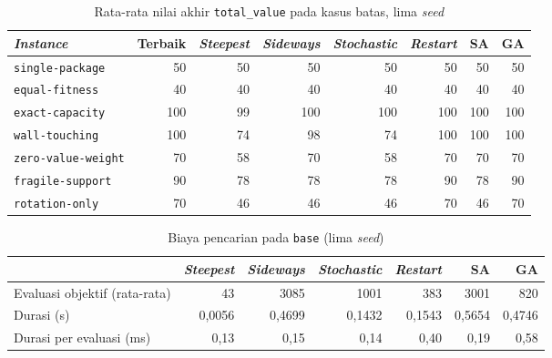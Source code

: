 \begin{table}[H]
    \centering
    \small
    \begin{tabular}{@{}lrrrrrrr@{}}
        \toprule
        \textit{Instance}          & Terbaik & \textit{Steepest} & \textit{Sideways} & \textit{Stochastic} & \textit{Restart} & SA  & GA  \\
        \midrule
        \texttt{single-package}    & 50      & 50                & 50                & 50                  & 50               & 50  & 50  \\
        \texttt{equal-fitness}     & 40      & 40                & 40                & 40                  & 40               & 40  & 40  \\
        \texttt{exact-capacity}    & 100     & 99                & 100               & 100                 & 100              & 100 & 100 \\
        \texttt{wall-touching}     & 100     & 74                & 98                & 74                  & 100              & 100 & 100 \\
        \texttt{zero-value-weight} & 70      & 58                & 70                & 58                  & 70               & 70  & 70  \\
        \texttt{fragile-support}   & 90      & 78                & 78                & 78                  & 90               & 78  & 90  \\
        \texttt{rotation-only}     & 70      & 46                & 46                & 46                  & 70               & 46  & 70  \\
        \bottomrule
    \end{tabular}
    \caption{Rata-rata nilai akhir \texttt{total\_value} pada kasus batas, lima \textit{seed}}
    \label{tab:bench-boundary}
\end{table}

\begin{table}[H]
    \centering
    \small
    \begin{tabular}{@{}lrrrrrr@{}}
        \toprule
                                      & \textit{Steepest} & \textit{Sideways} & \textit{Stochastic} & \textit{Restart} & SA     & GA     \\
        \midrule
        Evaluasi objektif (rata-rata) & 43                & 3085              & 1001                & 383              & 3001   & 820    \\
        Durasi (s)                    & 0,0056            & 0,4699            & 0,1432              & 0,1543           & 0,5654 & 0,4746 \\
        Durasi per evaluasi (ms)      & 0,13              & 0,15              & 0,14                & 0,40             & 0,19   & 0,58   \\
        \bottomrule
    \end{tabular}
    \caption{Biaya pencarian pada \texttt{base} (lima \textit{seed})}
    \label{tab:bench-cost}
\end{table}

